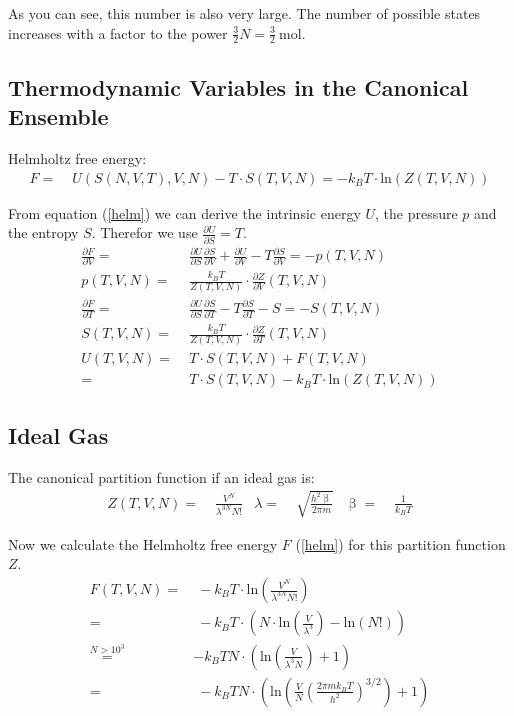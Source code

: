 \documentclass[11pt,a4paper]{scrartcl}
\renewcommand{\beta}{\upbeta}
\newcommand{\la}{\lambda}
\newcommand{\pdiff}[2]{\frac{\partial #1}{\partial #2}} %
\newcommand{\Ln}[1]{\text{ln}\left( #1 \right)}			%
\newcommand{\eref}[1]{(\ref{#1})}						%
\begin{document}
As you can see, this number is also very large. The number of possible states increases with a factor to the power $\frac{3}{2} N = \frac{3}{2}\SI{}{\mole}$.

\subsection{Thermodynamic Variables in the Canonical Ensemble}

Helmholtz free energy:
\begin{align}
F 
	=&\; U\left( S(N,V,T),V,N\right) -T\cdot S\left( T,V,N\right) 
	=-k_BT\cdot\Ln{Z(T,V,N)}
	\label{helm}
\end{align}

From equation \eref{helm} we can derive the intrinsic energy $U$, the pressure $p$ and the entropy $S$. Therefor we use $\pdiff{U}{S}=T$.
\begin{align}
\pdiff{F}{V} 
	=&\; \pdiff{U}{S}\pdiff{S}{V}+\pdiff{U}{V}-T\pdiff{S}{V}
	=-p(T,V,N)
	\label{hp}\\
p(T,V,N) 
	=&\; \frac{k_BT}{Z(T,V,N)}\cdot\pdiff{Z}{V}(T,V,N)
	\label{hp2}\\
\pdiff{F}{T} 
	=&\; \pdiff{U}{S}\pdiff{S}{T}-T\pdiff{S}{T}-S
	=-S(T,V,N)
	\label{hS}\\
S(T,V,N) 
	=&\; \frac{k_BT}{Z(T,V,N)}\cdot\pdiff{Z}{T}(T,V,N)
	\label{hS2}\\
U(T,V,N) 
	=&\; T\cdot S(T,V,N) + F(T,V,N)
	\label{hU}\\
=&\; T\cdot S(T,V,N)-k_BT\cdot\Ln{Z(T,V,N)}
	\label{hU2}	
\end{align}

\subsection{Ideal Gas}

The canonical partition function if an ideal gas is:
\begin{align}
Z(T,V,N)
	=&\; \frac{V^N}{\la^{3N}N!}
	&\la 
	=&\; \sqrt{\frac{h^2\beta}{2\pi m}}
	&\beta 
	=&\; \frac{1}{k_BT}
	\label{Zid}
\end{align}

Now we calculate the Helmholtz free energy $F$ \eref{helm} for this partition function $Z$.
\begin{align}
F(T,V,N)
	=&\; -k_BT\cdot\Ln{\frac{V^N}{\la^{3N}N!}}
	\label{f1}\\
	=&\; -k_BT\cdot\left(N\cdot\Ln{\frac{V}{\la^{3}}}-\Ln{N!}\right)
	\label{f2}\\
	\stackrel{N>10^3}{=}& -k_BTN\cdot\left(\Ln{\frac{V}{\la^{3}N}}+1\right)
	\label{f3}\\
=&\; -k_BTN\cdot\left(\Ln{\frac{V}{N}\left(\frac{2\pi mk_BT}{h^2}\right)^{3/2}}+1\right)
	\label{f4}
\end{align}
\end{document}
